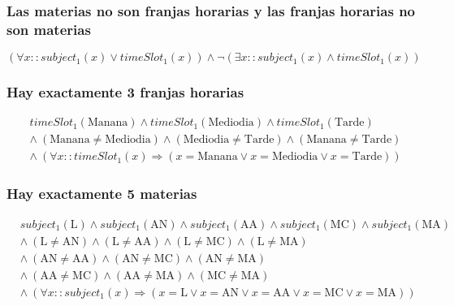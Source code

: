 \documentclass[a4paper,11pt]{article}
\begin{document}
\subsubsection{Las materias no son franjas horarias y las franjas horarias no son materias}
\begin{center}
    $(\forall x :: subject_1(x) \lor timeSlot_1(x)) \land \neg(\exists x :: subject_1(x) \land timeSlot_1(x))$
\end{center}

\subsubsection{Hay exactamente 3 franjas horarias}
\begin{center}
    \begin{align*}
         & timeSlot_1(\text{Manana}) \land timeSlot_1(\text{Mediodia}) \land timeSlot_1(\text{Tarde})                                       \\
         & \land\ (\text{Manana} \not= \text{Mediodia}) \land (\text{Mediodia} \not= \text{Tarde}) \land (\text{Manana} \not= \text{Tarde}) \\
         & \land\ (\forall x :: timeSlot_1(x) \Rightarrow (x = \text{Manana} \lor x = \text{Mediodia} \lor x = \text{Tarde}))
    \end{align*}
\end{center}

\subsubsection{Hay exactamente 5 materias}
\begin{center}
    \begin{align*}
         & subject_1(\text{L}) \land subject_1(\text{AN}) \land subject_1(\text{AA}) \land subject_1(\text{MC}) \land subject_1(\text{MA})           \\
         & \land\ (\text{L} \not= \text{AN}) \land (\text{L} \not= \text{AA}) \land (\text{L} \not= \text{MC}) \land (\text{L} \not= \text{MA})      \\
         & \land\ (\text{AN} \not= \text{AA}) \land (\text{AN} \not= \text{MC}) \land (\text{AN} \not= \text{MA})                                    \\
         & \land\ (\text{AA} \not= \text{MC}) \land (\text{AA} \not= \text{MA}) \land (\text{MC} \not= \text{MA})                                    \\
         & \land\ (\forall x :: subject_1(x) \Rightarrow (x = \text{L} \lor x = \text{AN} \lor x = \text{AA} \lor x = \text{MC} \lor x = \text{MA}))
    \end{align*}
\end{center}
\end{document}
